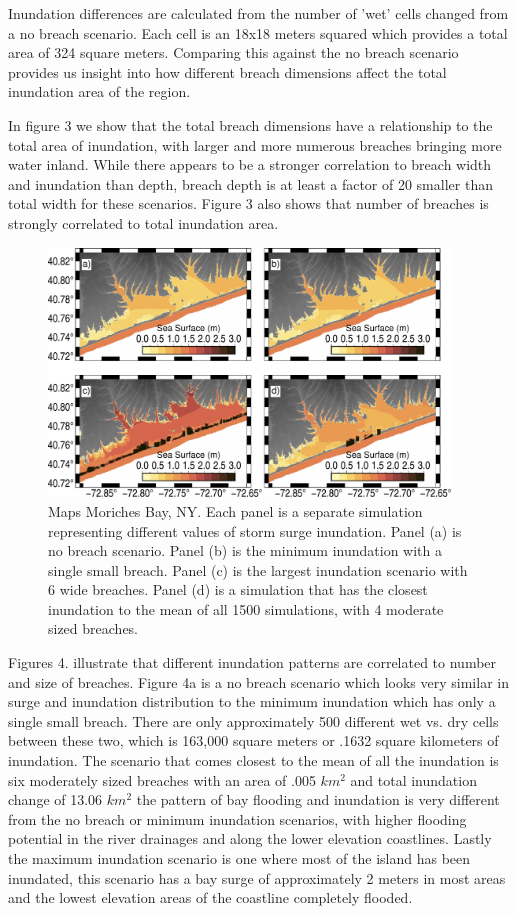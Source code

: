 \documentclass{coastal_paper}
\begin{document}
Inundation differences are calculated from the number of 'wet' cells changed from a no breach scenario. Each cell is an 18x18 meters squared which provides a total area of 324 square meters. Comparing this against the no breach scenario provides us insight into how different breach dimensions affect the total inundation area of the region.

In figure 3 we show that the total breach dimensions have a relationship to the total area of inundation, with larger and more numerous breaches bringing more water inland. While there appears to be a stronger correlation to breach width and inundation than depth, breach depth is at least a factor of 20 smaller than total width for these scenarios.
Figure 3 also shows that number of breaches is strongly correlated to total inundation area. 

\begin{figure}
    \centering
    \includegraphics[width=0.95\textwidth]{figures/fig4.pdf}

    \caption{Maps Moriches Bay, NY. Each panel is a separate simulation representing different values of storm surge inundation. Panel (a) is no breach scenario. Panel (b) is the minimum inundation with a single small breach. Panel (c) is the largest inundation scenario with 6 wide breaches. Panel (d)  is a simulation that has the closest inundation to the mean of all 1500 simulations, with 4 moderate sized breaches.}
    \label{fig:4}
\end{figure}

Figures 4. illustrate that different inundation patterns are correlated to number and size of breaches. Figure 4a is a no breach scenario which looks very similar in surge and inundation distribution to the minimum inundation which has only a single small breach. There are only approximately 500 different wet vs. dry cells between these two, which is 163,000 square meters or .1632 square kilometers of inundation. The scenario that comes closest to the mean of all the inundation is six moderately sized breaches with an area of .005 $km^2$ and total inundation change of 13.06 $km^2$ the pattern of bay flooding and inundation is very different from the no breach or minimum inundation scenarios, with higher flooding potential in the river drainages and along the lower elevation coastlines. Lastly the maximum inundation scenario is one where most of the island has been inundated, this scenario has a bay surge of approximately 2 meters in most areas and the lowest elevation areas of the coastline completely flooded.
\end{document}
